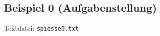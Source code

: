 \subsection{Beispiel 0 (Aufgabenstellung)}\label{example:0}
Textdatei: \texttt{spiesse0.txt}\\

\noindent
{}\\

\noindent
{}

